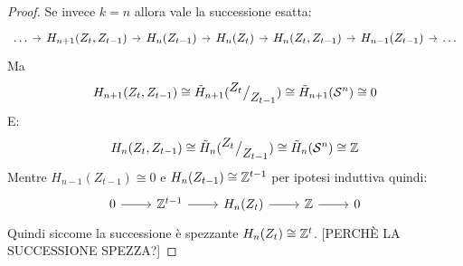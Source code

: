 \begin{proof}
  Se invece $ k = n $ allora vale la successione esatta:
  \[
    \begin{tikzcd}[nodes={column sep=7pt}]
      \dots \rar & H_{n+1}(Z_t, Z_{t-1}) \rar & H_n(Z_{t-1}) \rar & H _n(Z_t) \rar  & H_n(Z_t, Z_{t-1}) \rar & H_{n-1}(Z_{t-1}) \rar & \dots
    \end{tikzcd}
  \]
  Ma
  \[
    H_{n+1}(Z_t, Z_{t-1}) \cong \tilde{H}_{n+1}({^{\textstyle Z_t}\big/_{\textstyle Z_{t-1}}}) \cong \tilde{H}_{n+1}(\mathcal{S}^{n}) \cong 0
  \]
  E:
  \[
    H_{n}(Z_t, Z_{t-1}) \cong \tilde{H}_{n}({^{\textstyle Z_t}\big/_{\textstyle Z_{t-1}}}) \cong \tilde{H}_{n}(\mathcal{S}^{n}) \cong \mathbb{Z}
  \]
  Mentre $ H_{n-1}(Z_{t-1}) \cong 0 $ e $ H_{n}(Z_{t-1}) \cong \mathbb{Z}^{t-1} $ per ipotesi induttiva quindi:
  \[
    \begin{tikzcd}
      0 \rar   & \Z^{t-1} \rar & H_n(Z_t) \rar & \Z \rar & 0
    \end{tikzcd}
  \]
  Quindi siccome la successione è spezzante $ H_n(Z_t) \cong \mathbb{Z}^t $.
  [PERCHÈ LA SUCCESSIONE SPEZZA?]
\end{proof}

